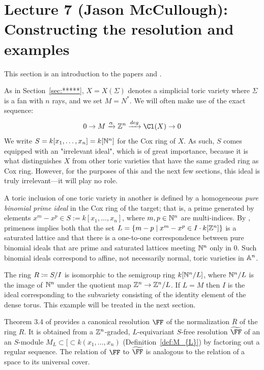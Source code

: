 \documentclass{amsart}
\begin{document}
\fi
\def\tF{{\widetilde \FF}}
\def\BT{{Bondal-Thomsen\ }}

\section{Lecture 7 (Jason McCullough): Constructing the resolution and examples}\label{lec:7-HHL-construction}
This section is an introduction to the papers \cite{BCS+25} and \cite{BH25}.

As in Section~\ref{sec:*****}, $X = X(\Sigma)$ denotes a simplicial toric variety where $\Sigma$ is a fan with $n$ rays, and we set $M = N^{*}$. We will often make use of the exact sequence:
$$
0\to M \xrightarrow {\alpha} \ZZ^{n} \xrightarrow {deg} \Cl(X) \to 0
$$
We write $S = k[x_{1},\dots,x_{n}]= k[\NN^{n}]$ for the Cox ring of $X$. As such, $S$ comes equipped with an "irrelevant ideal", which is of great importance, because it is what distinguishes $X$ from other
toric varieties that have the same graded ring as Cox ring. However, for the purposes of this and the next few sections, this ideal is truly irrelevant---it will play no role.


A toric inclusion of one toric variety in another is defined by a 
homogeneous \emph{pure binomial prime ideal}
in the Cox ring of the target; that is, a prime generated by elements $x^m-x^p \in S := k[x_1,\dots, x_n]$, where $m,p\in\NN^n$ are multi-indices. By \cite{ES96}, primeness implies both that
the set $L = \{m-p\mid x^m-x^p\in I \cdot k[\ZZ^n]\}$ is a saturated lattice and  that there is a one-to-one correspondence between pure binomial ideals that are prime and saturated lattices meeting
 $\NN^n$ only in 0. Such binomial ideals correspond to affine, not necessarily normal, toric varieties in $\AA^{n}$. 
 
 The ring $R \ce S/I$ is isomorphic to the semigroup ring $k[\NN^n/L]$, where $\NN^n/L$ is the image of $\NN^n$ under the quotient map $\ZZ^n\rightarrow \ZZ^n/L$.
 If $L = M $ then $I$ is the ideal corresponding to the subvariety consisting of the identity element of the dense torus. This example will be treated in the next section.


Theorem 3.4 of \cite{BCS+25} provides a canonical  resolution $\FF$ of the normalization $\overline R$
of the ring $R$. It is obtained from a $\ZZ^{n}$-graded, $L$-equivariant $S$-free resolution $\tF$ of an 
an $S$-module $M_L\subset [\subset k(x_{1}, \dots, x_{n})$ (Definition~\ref{def:M_{L}}) by factoring out a regular sequence.
The relation of $\FF$ to $\tF$ is analogous to the relation of a space to its universal cover.
\end{document}
